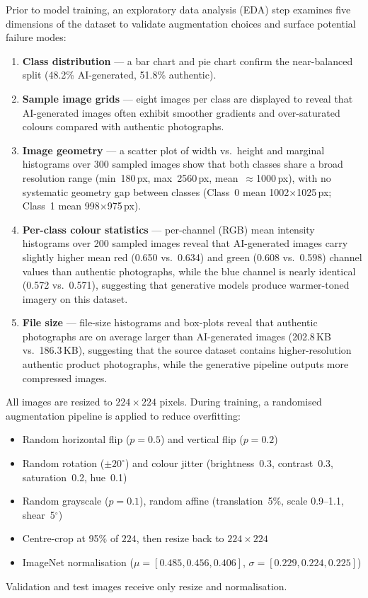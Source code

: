 \documentclass[conference]{IEEEtran}
\begin{document}
Prior to model training, an exploratory data analysis (EDA) step examines five
dimensions of the dataset to validate augmentation choices and surface potential
failure modes:
\begin{enumerate}
  \item \textbf{Class distribution} — a bar chart and pie chart confirm the
        near-balanced split (48.2\% AI-generated, 51.8\% authentic).
  \item \textbf{Sample image grids} — eight images per class are displayed to
        reveal that AI-generated images often exhibit smoother gradients and
        over-saturated colours compared with authentic photographs.
  \item \textbf{Image geometry} — a scatter plot of width vs.\ height and
        marginal histograms over 300 sampled images show that both classes share
        a broad resolution range (min~180\,px, max~2560\,px, mean~${\approx}$1000\,px),
        with no systematic geometry gap between classes (Class~0 mean 1002$\times$1025\,px;
        Class~1 mean 998$\times$975\,px).
  \item \textbf{Per-class colour statistics} — per-channel (RGB) mean intensity
        histograms over 200 sampled images reveal that AI-generated images
        carry slightly higher mean red (0.650 vs.\ 0.634) and green (0.608 vs.\
        0.598) channel values than authentic photographs, while the blue channel
        is nearly identical (0.572 vs.\ 0.571), suggesting that generative
        models produce warmer-toned imagery on this dataset.
  \item \textbf{File size} — file-size histograms and box-plots reveal that
        authentic photographs are on average larger than AI-generated images
        (202.8\,KB vs.\ 186.3\,KB), suggesting that the source dataset
        contains higher-resolution authentic product photographs, while the
        generative pipeline outputs more compressed images.
\end{enumerate}

All images are resized to $224 \times 224$ pixels.  During training, a
randomised augmentation pipeline is applied to reduce overfitting:
\begin{itemize}
  \item Random horizontal flip ($p=0.5$) and vertical flip ($p=0.2$)
  \item Random rotation ($\pm 20^{\circ}$) and colour jitter (brightness~0.3,
        contrast~0.3, saturation~0.2, hue~0.1)
  \item Random grayscale ($p=0.1$), random affine (translation~5\%, scale
        0.9--1.1, shear~5$^{\circ}$)
  \item Centre-crop at 95\% of $224$, then resize back to $224 \times 224$
  \item ImageNet normalisation ($\mu=[0.485,0.456,0.406]$,
        $\sigma=[0.229,0.224,0.225]$)
\end{itemize}
Validation and test images receive only resize and normalisation.
\end{document}
